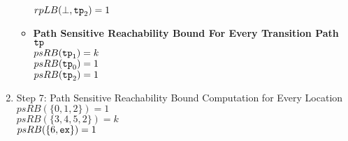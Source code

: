 \begin{enumerate}
\begin{itemize}
    $rpLB(\bot, \mathtt{tp}_2) = 1$ 
    \item \textbf{Path Sensitive Reachability Bound For Every Transition Path $\mathtt{tp}$ }
    \\
    $psRB(\mathtt{tp}_1) = k$
\\
    $psRB(\mathtt{tp}_0) = 1$ \\
    $psRB(\mathtt{tp}_2) = 1$ 
  \end{itemize}
  \item Step 7: Path Sensitive Reachability Bound Computation for Every Location
  \\
  $psRB(\{0, 1, 2\}) = 1$ \\
  $psRB(\{3, 4, 5, 2 \}) = k$
   \\
  $psRB(\{6, \mathtt{ex}\}) = 1$
  \end{enumerate}
